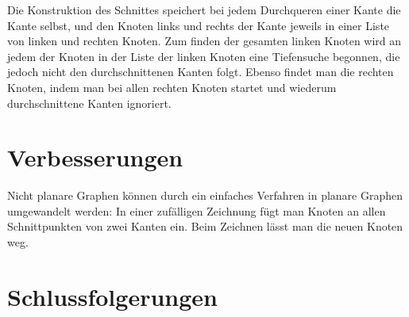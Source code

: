\documentclass[a4paper]{scrreprt}
\theoremstyle{definition}
\begin{document}
Die Konstruktion des Schnittes speichert bei jedem Durchqueren einer Kante die Kante selbst, und den Knoten links und rechts der Kante jeweils in einer Liste von linken und rechten Knoten. Zum finden der gesamten linken Knoten wird an jedem der Knoten in der Liste der linken Knoten eine Tiefensuche begonnen, die jedoch nicht den durchschnittenen Kanten folgt. Ebenso findet man die rechten Knoten, indem man bei allen rechten Knoten startet und wiederum durchschnittene Kanten ignoriert.

\chapter{Verbesserungen}







Nicht planare Graphen können durch ein einfaches Verfahren in planare Graphen umgewandelt werden: In einer zufälligen Zeichnung fügt man Knoten an allen Schnittpunkten von zwei Kanten ein. Beim Zeichnen lässt man die neuen Knoten weg.


\chapter{Schlussfolgerungen}







\end{document}
